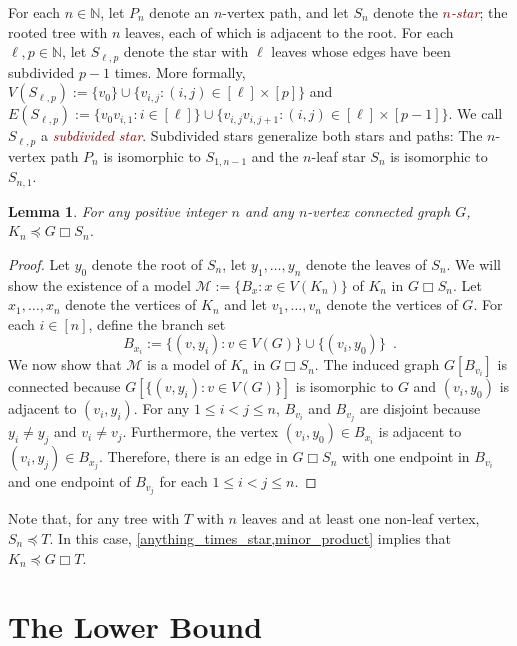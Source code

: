 \documentclass[kpfonts,lotsofwhite]{patmorin}
\newcommand{\defn}[1]{\textcolor{Maroon}{\emph{#1}}}
\newcommand{\boxprod}{\mathbin{\Box}}
\newcommand{\N}{\mathbb{N}}
\renewcommand{\le}{\leqslant}
\DeclareMathOperator{\gm}{gm}
\theoremstyle{plain}
\newtheorem{lem}[thm]{Lemma}
\theoremstyle{definition}
\begin{document}
For each $n\in \N$, let $P_n$ denote an $n$-vertex path, and let $S_n$ denote the \defn{$n$-star}; the rooted tree with $n$ leaves, each of which is adjacent to the root.  For each $\ell,p\in\N$, let $S_{\ell,p}$ denote the star with $\ell$ leaves whose edges have been subdivided $p-1$ times.  More formally, $V(S_{\ell,p}):=\{v_0\}\cup\{v_{i,j}:(i,j)\in[\ell]\times[p]\}$ and $E(S_{\ell,p}):=\{v_0v_{i,1}:i\in[\ell]\}\cup \{v_{i,j}v_{i,j+1}:(i,j)\in[\ell]\times[p-1]\}$.  We call $S_{\ell,p}$ a \defn{subdivided star}.  Subdivided stars generalize both stars and paths: The $n$-vertex path $P_n$ is isomorphic to $S_{1,n-1}$ and the $n$-leaf star $S_n$ is isomorphic to $S_{n,1}$.

\begin{lem}\label{anything_times_star}
  For any positive integer $n$ and any $n$-vertex connected graph $G$, $K_{n} \preceq G\boxprod S_n$.
\end{lem}

\begin{proof}
  Let $y_0$ denote the root of $S_n$, let $y_1,\ldots,y_n$ denote the leaves of $S_n$.  We will show the existence of a model $\mathcal{M}:=\{B_x:x\in V(K_n)\}$ of $K_n$ in $G\boxprod S_n$.  Let $x_1,\ldots,x_{n}$ denote the vertices of $K_{n}$ and let $v_1,\ldots,v_n$ denote the vertices of $G$.  For each $i\in[n]$, define the branch set
  \[
     B_{x_i}:=\{(v,y_i):v\in V(G)\} \cup \{ (v_{i},y_0) \} \enspace .
  \]
  We now show that $\mathcal{M}$ is a model of $K_n$ in $G\boxprod S_n$.
  The induced graph $G[B_{v_i}]$ is connected because $G[\{(v,y_i):v\in V(G)\}]$ is isomorphic to $G$ and $(v_{i},y_0)$ is adjacent to $(v_{i},y_i)$.
  For any $1\le i< j\le n$, $B_{v_i}$ and $B_{v_j}$ are disjoint because $y_i\neq y_j$ and $v_i\neq v_j$.  Furthermore, the vertex $(v_{i},y_0)\in B_{x_i}$ is adjacent to $(v_i,y_j)\in B_{x_j}$.  Therefore, there is an edge in $G\boxprod S_n$ with one endpoint in $B_{v_i}$ and one endpoint of $B_{v_j}$ for each $1\le i < j\le n$.
\end{proof}

Note that, for any tree with $T$ with $n$ leaves and at least one non-leaf vertex, $S_n\preceq T$.  In this case, \cref{anything_times_star,minor_product} implies that $K_n\preceq G\boxprod T$.

\section{The Lower Bound}

\end{document}
